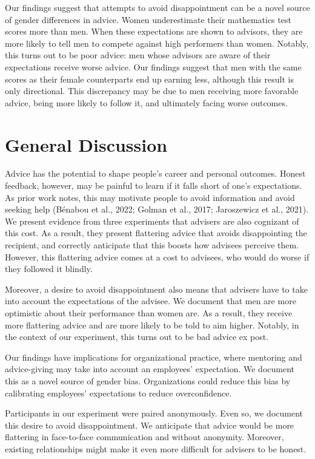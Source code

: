 \documentclass[
  man,
  floatsintext,
  longtable,
  nolmodern,
  notxfonts,
  notimes,
  colorlinks=true,linkcolor=blue,citecolor=blue,urlcolor=blue]{apa7}
\begin{document}
Our findings suggest that attempts to avoid disappointment can be a
novel source of gender differences in advice. Women underestimate their
mathematics test scores more than men. When these expectations are shown
to advisors, they are more likely to tell men to compete against high
performers than women. Notably, this turns out to be poor advice: men
whose advisors are aware of their expectations receive worse advice. Our
findings suggest that men with the same scores as their female
counterparts end up earning less, although this result is only
directional. This discrepancy may be due to men receiving more favorable
advice, being more likely to follow it, and ultimately facing worse
outcomes.

\section{General Discussion}\label{general-discussion}

Advice has the potential to shape people's career and personal outcomes.
Honest feedback, however, may be painful to learn if it falls short of
one's expectations. As prior work notes, this may motivate people to
avoid information and avoid seeking help (Bénabou et al., 2022; Golman
et al., 2017; Jaroszewicz et al., 2021). We present evidence from three
experiments that advisers are also cognizant of this cost. As a result,
they present flattering advice that avoids disappointing the recipient,
and correctly anticipate that this boosts how advisees perceive them.
However, this flattering advice comes at a cost to advisees, who would
do worse if they followed it blindly.

Moreover, a desire to avoid disappointment also means that advisers have
to take into account the expectations of the advisee. We document that
men are more optimistic about their performance than women are. As a
result, they receive more flattering advice and are more likely to be
told to aim higher. Notably, in the context of our experiment, this
turns out to be bad advice ex post.

Our findings have implications for organizational practice, where
mentoring and advice-giving may take into account an employees'
expectation. We document this as a novel source of gender bias.
Organizations could reduce this bias by calibrating employees'
expectations to reduce overconfidence.

Participants in our experiment were paired anonymously. Even so, we
document this desire to avoid disappointment. We anticipate that advice
would be more flattering in face-to-face communication and without
anonymity. Moreover, existing relationships might make it even more
difficult for advisers to be honest.
\end{document}
